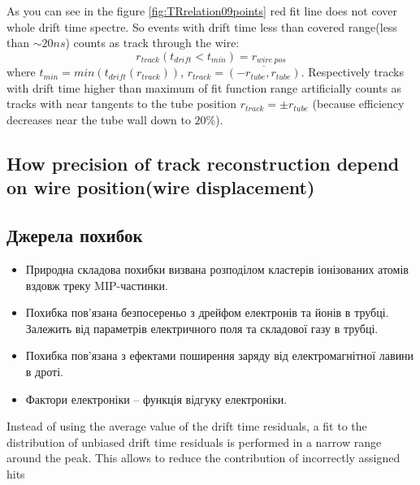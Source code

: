 \documentclass[]{article}
\begin{document}
	As you can see in the figure \ref{fig:TRrelation09points} red fit line does not cover whole drift time spectre. So events with drift time less than covered range(less than $\sim20 ns$) counts as track through the wire:
	\begin{equation}
	r_{track}(t_{drift} < t_{min}) = r_{wire~pos}
	\end{equation}
	where $t_{min} = min (t_{drift}(r_{track}))$, $r_{track} = \overline{(-r_{tube},r_{tube})}$. Respectively tracks with drift time higher than maximum of fit function range artificially counts as tracks with near tangents to the tube position $r_{track} = \pm r_{tube}$  (because efficiency decreases near the tube wall down to $20\%$).
	
	\subsection{How precision of track reconstruction depend on wire position(wire displacement)}		
	
	\subsection{Джерела похибок}
	
	\begin{itemize}
		\item Природна складова похибки визвана розподілом кластерів іонізованих атомів вздовж треку MIP-частинки.\par
		\item Похибка пов’язана безпосереньо з дрейфом електронів та йонів в трубці. Залежить від параметрів електричного поля та складової газу в трубці.
		\item Похибка пов’язана з ефектами поширення заряду від електромагнітної лавини в дроті.
		\item Фактори електроніки -- функція відгуку електроніки.
	\end{itemize}
	
	Instead of using the average value of the drift time residuals, a fit to the distribution of unbiased drift time residuals is performed in a narrow range around the peak. This allows to reduce the contribution of incorrectly assigned hits
\end{document}
